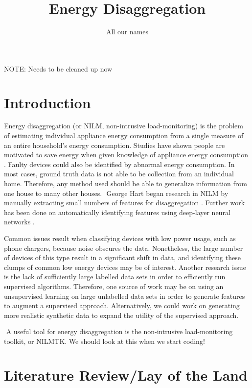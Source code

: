 \documentclass{article}
\title{Energy Disaggregation}
\author{All our names}
\date{}
\begin{document}
\maketitle


NOTE: Needs to be cleaned up now

\section{Introduction}


Energy disaggregation (or NILM, non-intrusive load-monitoring) is the problem of estimating individual appliance energy consumption from a single measure of an entire household's energy consumption.
Studies have shown people are motivated to save energy when given knowledge of appliance energy consumption \cite{Darby}.
Faulty devices could also be identified by abnormal energy consumption.
In most cases, ground truth data is not able to be collection from an individual home.
Therefore, any method used should be able to generalize information from one house to many other houses.
​
George Hart began research in NILM by manually extracting small numbers of features for disaggregation \cite{Hart2, Hart1}.
Further work has been done on automatically identifying features using deep-layer neural networks \cite{ Kelly}.

Common issues result when classifying devices with low power usage, such as phone chargers, because noise obscures the data.
Nonetheless, the large number of devices of this type result in a significant shift in data, and identifying these clumps of common low energy devices may be of interest.
Another research issue is the lack of sufficiently large labelled data sets in order to efficiently run supervised algorithms.
Therefore, one source of work may be on using an unsupervised learning on large unlabelled data sets in order to generate features to augment a supervised approach.
Alternatively, we could work on generating more realistic synthetic data to expand the utility of the supervised approach.

​
A useful tool for energy disaggregation is the non-intrusive load-monitoring toolkit, or NILMTK.
We should look at this when we start coding!



\section{Literature Review/Lay of the Land}
\end{document}
